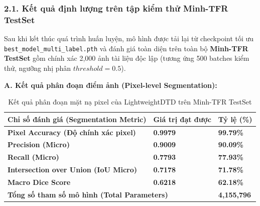 \subsubsection{2.1. Kết quả định lượng trên tập kiểm thử Minh-TFR TestSet}
\indent\indent Sau khi kết thúc quá trình huấn luyện, mô hình được tải lại từ checkpoint tối ưu \texttt{best\_model\_multi\_label.pth} và đánh giá toàn diện trên toàn bộ \textbf{Minh-TFR TestSet} gồm chính xác 2,000 ảnh tài liệu độc lập (tương ứng 500 batches kiểm thử, ngưỡng nhị phân $threshold = 0.5$).

\textbf{A. Kết quả phân đoạn điểm ảnh (Pixel-level Segmentation):}
\begin{table}[H]
    \centering
    \caption{Kết quả phân đoạn mặt nạ pixel của LightweightDTD trên Minh-TFR TestSet}
    \label{tab:test_seg_results}
    \vspace{0.2cm}
    \renewcommand{\arraystretch}{1.3}
    \begin{tabular}{|m{6.5cm}|m{4cm}|m{3.5cm}|}
        \hline
        \textbf{Chỉ số đánh giá (Segmentation Metric)} & \textbf{Giá trị đạt được} & \textbf{Tỷ lệ (\%)} \\
        \hline
        \textbf{Pixel Accuracy (Độ chính xác pixel)} & \textbf{0.9979} & \textbf{99.79\%} \\
        \hline
        \textbf{Precision (Micro)} & \textbf{0.9009} & \textbf{90.09\%} \\
        \hline
        \textbf{Recall (Micro)} & \textbf{0.7793} & \textbf{77.93\%} \\
        \hline
        \textbf{Intersection over Union (IoU Micro)} & \textbf{0.7178} & \textbf{71.78\%} \\
        \hline
        \textbf{Macro Dice Score} & \textbf{0.6218} & \textbf{62.18\%} \\
        \hline
        \multicolumn{2}{|l|}{\textbf{Tổng số tham số mô hình (Total Parameters)}} & \textbf{4,155,796} \\
        \hline
    \end{tabular}
\end{table}

